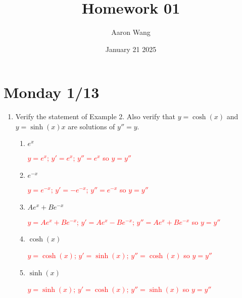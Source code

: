 \documentclass{article}
\title{Homework 01}
\author{Aaron Wang}
\date{January 21 2025}
\begin{document}
\maketitle
\section{Monday 1/13}
\begin{enumerate}
    \item Verify the statement of Example 2. Also verify that $y = \cosh(x)$ and $y = \sinh(x)x$ are solutions of $y''=y$.
    \begin{enumerate}
        \item $e^x$
        \textcolor{red}{
        \begin{center}
            $y=e^x$; $y'=e^x$; $y''=e^x$ so $y=y''$
        \end{center}
        }
        
        \item $e^{-x}$
        \textcolor{red}{
        \begin{center}
            $y=e^{-x}$; $y'=-e^{-x}$; $y''=e^{-x}$ so $y=y''$
        \end{center}
        }
        
        \item $Ae^x+Be^{-x}$
        \textcolor{red}{
        \begin{center}
            $y=Ae^x+Be^{-x}$; $y'=Ae^x-Be^{-x}$; $y''=Ae^x+Be^{-x}$ so $y=y''$
        \end{center}
        }
        
        \item $\cosh(x)$
        \textcolor{red}{
        \begin{center}
            $y=\cosh(x)$; $y'=\sinh(x)$; $y''=\cosh(x)$ so $y=y''$
        \end{center}
        }
        
        \item $\sinh(x)$
        \textcolor{red}{
        \begin{center}
            $y=\sinh(x)$; $y'=\cosh(x)$; $y''=\sinh(x)$ so $y=y''$
        \end{center}
        }
        

\end{enumerate}
\end{enumerate}
\end{document}
